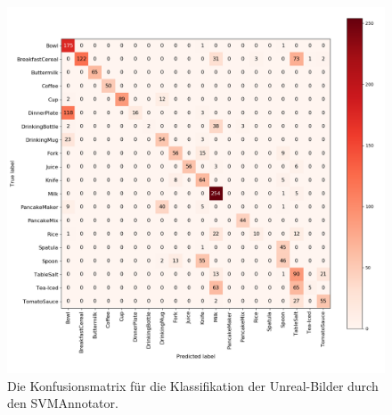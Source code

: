 \begin{figure}
	\includegraphics[scale=.4]{img/chapter6/classifierSVMconf_matrix.png}
\caption[Konfusionsmatrix der Klassifizierung durch den SVMAnnotators]{Die Konfusionsmatrix für die Klassifikation der Unreal-Bilder durch den SVMAnnotator.}
\label{fig:classiSVM_Ex_confMatrix}
\end{figure}

